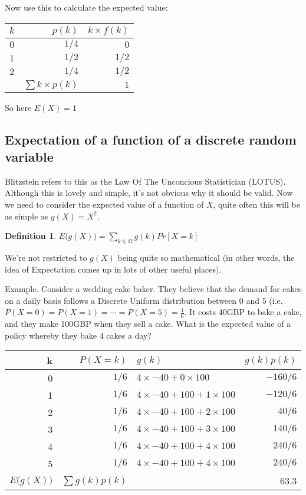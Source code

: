 \documentclass[12pt]{extbook}
\newtheorem{df}{Definition}[section]
\begin{document}
Now use this to calculate the expected value:

\begin{tabular}{rrr}
$k$ & $p(k)$ & $k \times f(k)$ \\
\hline
$0$ & $1/4$ & $0$ \\
$1$ & $1/2$ & $1/2$ \\
$2$ & $1/4$ & $1/2$ \\
\hline
 & $\sum k\times p(k)$ & $1$
\end{tabular}

So here $E(X)=1$


\subsection{Expectation of a function of a discrete random variable}

Blitzstein refers to this as the Law Of The Unconcious Statistician (LOTUS).   Although this is lovely and simple, it's not obvious why it should be valid.
  Now we need to consider the expected value of a function of $X$, quite often this will be as simple as $g(X) = X^2$.

\begin{df}
$E\big( g(X) \big) = \sum_{k \in \Omega} g(k) Pr[X=k]$
\end{df}




We're not restricted to $g(X)$ being quite so mathematical (in other words, the idea of Expectation comes up in lots of other useful places).


Example. Consider a wedding cake baker.   They believe that the demand for cakes on a daily basis follows a Discrete Uniform distribution between 0 and 5 (i.e. $P(X=0)=P(X=1)= \cdots =P(X=5) = \frac{1}{6}$.   It costs 40GBP to bake a cake, and they make 100GBP when they sell a cake.   What is the expected value of a policy whereby they bake 4 cakes a day?

\begin{tabular}{rrlr}
k    & $P(X=k)$ & $g(k)$ & $g(k)p(k)$ \\ 
\hline
0 & $1/6$ & $4 \times -40 + 0 \times 100$ & $-160/6$ \\
1 & $1/6$ & $4 \times -40 + 100 + 1 \times 100$ & $-120/6$ \\
2 & $1/6$ & $4 \times -40 + 100 + 2 \times 100$ & $40/6$ \\
3 & $1/6$ & $4 \times -40 + 100 + 3 \times 100$ & $140/6$ \\
4 & $1/6$ & $4 \times -40 + 100 + 4 \times 100$ & $240/6$ \\
5 & $1/6$ & $4 \times -40 + 100 + 4 \times 100$ & $240/6$ \\
\hline
$E \big( g(X) \big)$ & $\sum g(k)p(k)$ & & 63.3  
\end{tabular}
\end{document}
